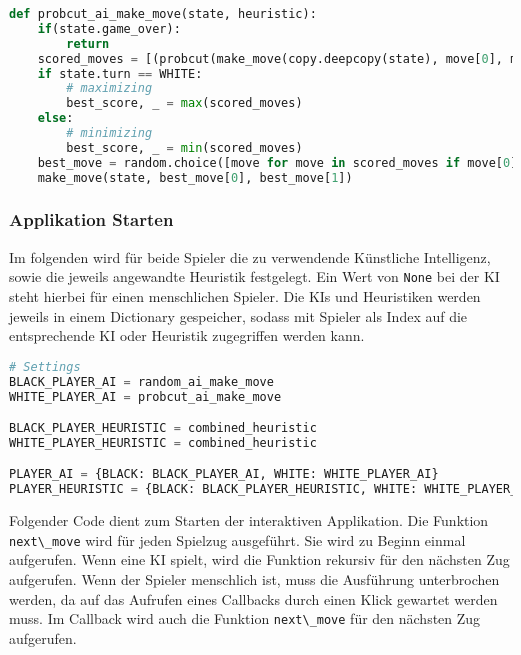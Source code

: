 \begin{lstlisting}[language=Python]
def probcut_ai_make_move(state, heuristic):
    if(state.game_over):
        return
    scored_moves = [(probcut(make_move(copy.deepcopy(state), move[0], move[1]), PROBCUT_DEPTH-1, -math.inf, math.inf, heuristic), move) for move in state.possible_moves]
    if state.turn == WHITE:
        # maximizing
        best_score, _ = max(scored_moves)
    else:
        # minimizing
        best_score, _ = min(scored_moves)
    best_move = random.choice([move for move in scored_moves if move[0] == best_score])[1]
    make_move(state, best_move[0], best_move[1])
\end{lstlisting}

\hypertarget{applikation-starten}{%
\subsubsection{Applikation Starten}\label{applikation-starten}}

Im folgenden wird für beide Spieler die zu verwendende Künstliche
Intelligenz, sowie die jeweils angewandte Heuristik festgelegt. Ein Wert
von \passthrough{\lstinline!None!} bei der KI steht hierbei für einen
menschlichen Spieler. Die KIs und Heuristiken werden jeweils in einem
Dictionary gespeicher, sodass mit Spieler als Index auf die
entsprechende KI oder Heuristik zugegriffen werden kann.

\begin{lstlisting}[language=Python]
# Settings
BLACK_PLAYER_AI = random_ai_make_move
WHITE_PLAYER_AI = probcut_ai_make_move

BLACK_PLAYER_HEURISTIC = combined_heuristic
WHITE_PLAYER_HEURISTIC = combined_heuristic

PLAYER_AI = {BLACK: BLACK_PLAYER_AI, WHITE: WHITE_PLAYER_AI}
PLAYER_HEURISTIC = {BLACK: BLACK_PLAYER_HEURISTIC, WHITE: WHITE_PLAYER_HEURISTIC}
\end{lstlisting}

Folgender Code dient zum Starten der interaktiven Applikation. Die
Funktion \passthrough{\lstinline!next\_move!} wird für jeden Spielzug
ausgeführt. Sie wird zu Beginn einmal aufgerufen. Wenn eine KI spielt,
wird die Funktion rekursiv für den nächsten Zug aufgerufen. Wenn der
Spieler menschlich ist, muss die Ausführung unterbrochen werden, da auf
das Aufrufen eines Callbacks durch einen Klick gewartet werden muss. Im
Callback wird auch die Funktion \passthrough{\lstinline!next\_move!} für
den nächsten Zug aufgerufen.

